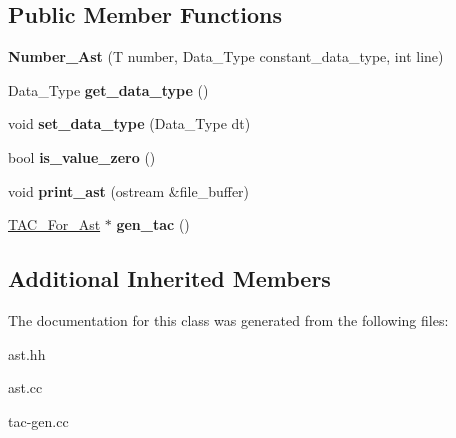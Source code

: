 \subsection*{Public Member Functions}
\begin{DoxyCompactItemize}
\item 
\mbox{\label{classNumber__Ast_a43c07513519b323df1c52c19e6b7a29c}} 
{\bfseries Number\+\_\+\+Ast} (T number, Data\+\_\+\+Type constant\+\_\+data\+\_\+type, int line)
\item 
\mbox{\label{classNumber__Ast_abbab495337bff5e8ae43322a98a5f7a7}} 
Data\+\_\+\+Type {\bfseries get\+\_\+data\+\_\+type} ()
\item 
\mbox{\label{classNumber__Ast_ae0217e559149200f07ce70e0047d8785}} 
void {\bfseries set\+\_\+data\+\_\+type} (Data\+\_\+\+Type dt)
\item 
\mbox{\label{classNumber__Ast_a7d4dc495968e66a73a6a894031e3b1cf}} 
bool {\bfseries is\+\_\+value\+\_\+zero} ()
\item 
\mbox{\label{classNumber__Ast_a96f8e53ff56d1b047b4f59cef58eb9b6}} 
void {\bfseries print\+\_\+ast} (ostream \&file\+\_\+buffer)
\item 
\mbox{\label{classNumber__Ast_a9ed2235e0980563bea67140b16c04438}} 
\hyperlink{classTAC__For__Ast}{T\+A\+C\+\_\+\+For\+\_\+\+Ast} $\ast$ {\bfseries gen\+\_\+tac} ()
\end{DoxyCompactItemize}
\subsection*{Additional Inherited Members}


The documentation for this class was generated from the following files\+:\begin{DoxyCompactItemize}
\item 
ast.\+hh\item 
ast.\+cc\item 
tac-\/gen.\+cc\end{DoxyCompactItemize}

